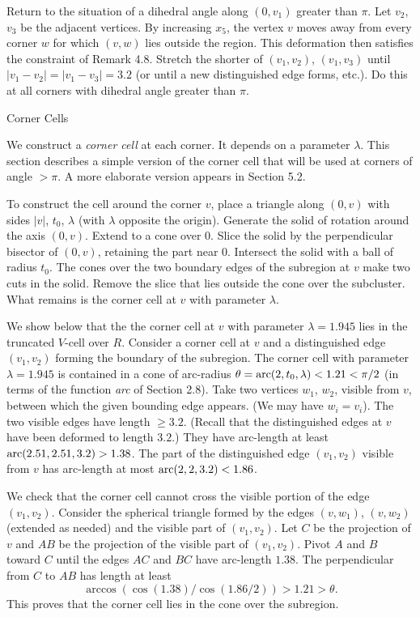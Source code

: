 Return to the situation of a dihedral angle along $(0,v_1)$ 
greater than $\pi$. Let $v_2$, $v_3$ be the adjacent vertices.
By increasing $x_5$, the vertex $v$ moves away from every corner
$w$ for which $(v,w)$ lies outside the region.  This deformation
then satisfies the constraint of Remark 4.8.  Stretch the shorter
of $(v_1,v_2)$, $(v_1,v_3)$ until $|v_1-v_2|=|v_1-v_3|=3.2$
(or until a new distinguished edge forms, etc.).  Do this at
all corners with dihedral angle greater than $\pi$.


\subhead {} Corner Cells\endsubhead

We construct a {\it corner cell\/}
at each corner.  It depends
on a parameter $\lambda$.  This section describes a simple version
of the corner cell that will be used at corners of angle $>\pi$.
A more elaborate version appears in Section 5.2.

To construct the cell around
the corner $v$,
place a triangle along $(0,v)$ with sides $|v|$, $t_0$, $\lambda$ 
(with $\lambda$ opposite the origin).  
Generate the solid of rotation around the axis $(0,v)$.  Extend to
a cone over $0$.  Slice the solid by the perpendicular bisector of
$(0,v)$, retaining the part near $0$.  Intersect the solid with
a ball of radius $t_0$.   The cones over the two boundary edges
of the subregion at $v$ make two cuts in the solid.  Remove the
slice that lies outside the cone over the subcluster.  What remains
is the corner cell at $v$ with parameter $\lambda$.

We show below that the the corner cell at $v$ with parameter $\lambda=1.945$
lies in the truncated $V$-cell over $R$.  
Consider a  corner cell at $v$ and a distinguished
edge $(v_1,v_2)$ forming the boundary of the subregion.
The corner cell with parameter $\lambda=1.945$ 
is contained in a cone of arc-radius
$\theta = \operatorname{arc}(2,t_0,\lambda)< 1.21 <\pi/2$
(in terms of the function {\it arc\/} of Section 2.8).
Take two vertices $w_1$, $w_2$, visible from $v$,
 between which the given bounding edge
appears. (We may have $w_i=v_i$). 
The two visible edges have length $\ge 3.2$.
(Recall that the distinguished edges at $v$ have been
deformed to length $3.2$.) 
They have arc-length at least $\operatorname{arc}(2.51,2.51,3.2)>1.38$.
The part of the distinguished edge
$(v_1,v_2)$ visible from $v$ has arc-length at most $\operatorname{arc}(2,2,3.2)<1.86$.

We check that the corner cell cannot cross the visible
portion of the edge $(v_1,v_2)$. 
Consider the spherical triangle formed by the edges $(v,w_1)$,
$(v,w_2)$ (extended as needed) and the visible part of $(v_1,v_2)$.
Let $C$ be the projection of
$v$ and $AB$ be the projection of the visible part of $(v_1,v_2)$.
Pivot $A$ and $B$ toward $C$ until the edges $AC$ and $BC$ have
arc-length $1.38$.  The perpendicular
from $C$ to $AB$ has length at least
	$$\arccos(\cos(1.38)/\cos(1.86/2))>1.21>\theta.$$
This proves that the corner cell lies in the cone over the subregion.

